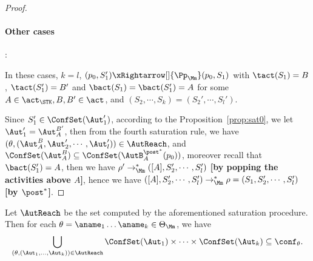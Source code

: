 \begin{proof}
\paragraph{Other cases}: 

In these cases, $k = l$, $(p_0,S_1')\xRightarrow[]{\Pp_{\Mm}}(p_0,S_1)$ with $\tact(S_1) = B$, $\tact(S_1') = B'$ and $\bact(S_1)=\bact(S_1')=A$ for some $A\in\act_{\STK},B,B'\in\act$, and $(S_2,\cdots,S_k) = (S_2',\cdots,S_l')$.

Since $S_1'\in\ConfSet(\Aut_1')$, according to the Proposition~\ref{prop:sat0}, we let $\Aut_1'=\Aut_A^{B'}$, then from the fourth saturation rule, we have $(\theta,(\Aut_A^{B},\Aut_2',\cdots,\Aut_l'))\in\AutReach$, and $\ConfSet(\Aut_A^B)\subseteq\ConfSet(\AutB_A^{\post^*}(p_0))$,
moreover recall that $\bact(S_1') = A$, then we have $\rho'\rightarrow_{\Mm}^*([A],S_2',\cdots,S_l')$ \textbf{[by popping the activities above $A$]}, hence we have $([A],S_2',\cdots,S_l')\rightarrow_{\Mm}^*\rho = (S_1,S_2',\cdots,S_l')$ \textbf{[by $\post^*$]}.





\end{proof}

\begin{lemma}
    Let $\AutReach$ be the set computed by the aforementioned saturation procedure. Then for each $\theta = \aname_1 \dots \aname_k \in \Theta_\Mm$, we have 
    $$\bigcup \limits_{(\theta, (\Aut_1, \dots, \Aut_k)) \in \AutReach} \ConfSet(\Aut_1) \times \dots \times \ConfSet(\Aut_k) \subseteq \conf_\theta.$$

\end{lemma}

